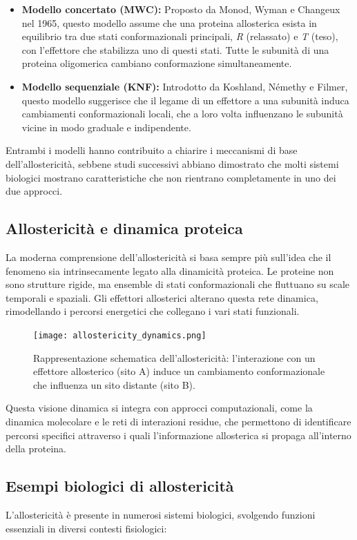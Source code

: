 \documentclass[Lau,binding=0.6cm,oneside,noexaminfo]{sapthesis}
\begin{document}
\begin{itemize}
    \item \textbf{Modello concertato (MWC):} Proposto da Monod, Wyman e Changeux nel 1965, questo modello assume che una proteina allosterica esista in equilibrio tra due stati conformazionali principali, \emph{R} (relassato) e \emph{T} (teso), con l’effettore che stabilizza uno di questi stati. Tutte le subunità di una proteina oligomerica cambiano conformazione simultaneamente.
    \item \textbf{Modello sequenziale (KNF):} Introdotto da Koshland, Némethy e Filmer, questo modello suggerisce che il legame di un effettore a una subunità induca cambiamenti conformazionali locali, che a loro volta influenzano le subunità vicine in modo graduale e indipendente.
\end{itemize}

Entrambi i modelli hanno contribuito a chiarire i meccanismi di base dell’allostericità, sebbene studi successivi abbiano dimostrato che molti sistemi biologici mostrano caratteristiche che non rientrano completamente in uno dei due approcci.

\subsection*{Allostericità e dinamica proteica}
La moderna comprensione dell’allostericità si basa sempre più sull’idea che il fenomeno sia intrinsecamente legato alla dinamicità proteica. Le proteine non sono strutture rigide, ma ensemble di stati conformazionali che fluttuano su scale temporali e spaziali. Gli effettori allosterici alterano questa rete dinamica, rimodellando i percorsi energetici che collegano i vari stati funzionali.

\begin{figure}[h!]
    \centering
    \texttt{[image: allostericity\_dynamics.png]}
    \caption{Rappresentazione schematica dell’allostericità: l’interazione con un effettore allosterico (sito A) induce un cambiamento conformazionale che influenza un sito distante (sito B).}
    \label{fig:allostericity}
\end{figure}

Questa visione dinamica si integra con approcci computazionali, come la dinamica molecolare e le reti di interazioni residue, che permettono di identificare percorsi specifici attraverso i quali l’informazione allosterica si propaga all’interno della proteina.

\subsection*{Esempi biologici di allostericità}
L’allostericità è presente in numerosi sistemi biologici, svolgendo funzioni essenziali in diversi contesti fisiologici:
\end{document}
